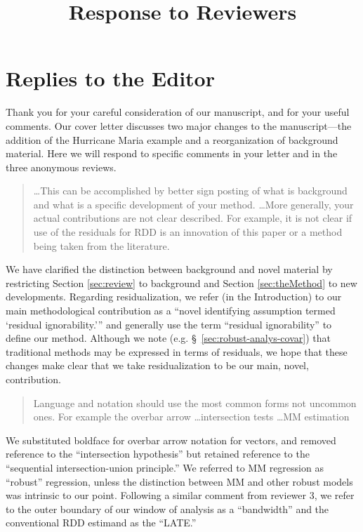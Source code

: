 \documentclass[12pt]{article}
\title{Response to Reviewers}
\begin{document}
\maketitle



\section{Replies to the Editor}
Thank you for your careful consideration of our manuscript, and for
your useful comments. Our cover letter discusses two major changes to
the manuscript---the addition of the Hurricane Maria example and a
reorganization of background material. Here we will respond to
specific comments in your letter and in the three anonymous reviews.

\begin{quote}
\dots This can be accomplished by better sign posting of what
is background and what is a specific development of your
method.
\dots More generally, your actual contributions
are not clear described. For example, it is not clear if use of the
residuals for RDD is an innovation of this paper or a method being
taken from the literature.
\end{quote}
We have clarified the distinction between background and novel
material by restricting Section
\ref{sec:review} to background and Section \ref{sec:theMethod} to new
developments.
Regarding residualization, we refer (in the
Introduction) to our main
methodological contribution as a ``novel identifying assumption termed
`residual ignorability.''' and generally use the term ``residual
ignorability'' to define our method.
Although we note (e.g. \S~\ref{sec:robust-analys-covar}) that
traditional methods may be expressed in terms of residuals, we hope
that these changes make clear that we take residualization to be our
main, novel, contribution.

\begin{quote}
Language and notation should use the most common forms not
uncommon ones. For example the overbar arrow \dots intersection tests \dots MM
estimation
\end{quote}
We substituted boldface for overbar arrow notation for vectors, and removed reference to
the ``intersection hypothesis'' but retained reference to the
``sequential intersection-union principle.'' We referred to MM
regression as ``robust'' regression, unless the distinction between MM
and other robust models was intrinsic to our point. Following a
similar comment from reviewer 3, we refer to the outer boundary of our
window of analysis as a ``bandwidth'' and the conventional RDD
estimand as the ``LATE.''
\end{document}
